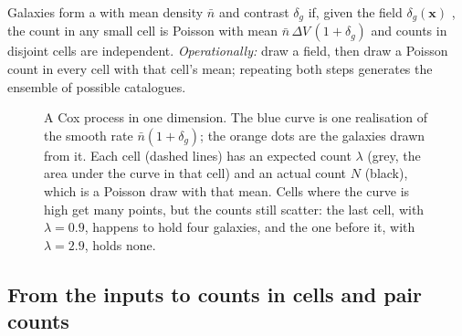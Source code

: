 \begin{workdef}
Galaxies form a  with mean density $\bar n$ and contrast
$\delta_g$ if, given the field $\delta_g(\bm x)$ , the count in any small cell is Poisson with mean
$\bar n\,\Delta V\,(1+\delta_g)$ and counts in disjoint cells are independent.
\emph{Operationally:} draw a field, then draw a Poisson count in every cell with
that cell's mean; repeating both steps generates the ensemble of possible
catalogues.
\end{workdef}

\begin{figure}[htbp]
\centering
{}
\caption{A Cox process in one dimension. The blue curve is one realisation of the
smooth rate $\bar n(1+\delta_g)$; the orange dots are the galaxies drawn from it.
Each cell (dashed lines) has an expected count $\lambda$ (grey, the area under
the curve in that cell) and an actual count $N$ (black), which is a Poisson draw
with that mean. Cells where the curve is high get many points, but the counts
still scatter: the last cell, with $\lambda=0.9$, happens to hold four galaxies, and
the one before it, with $\lambda=2.9$, holds none.}
\label{11a:fig:cox1d}
\end{figure}

\subsection{From the inputs to counts in cells and pair counts}
\label{11a:sec:cox-moments}

